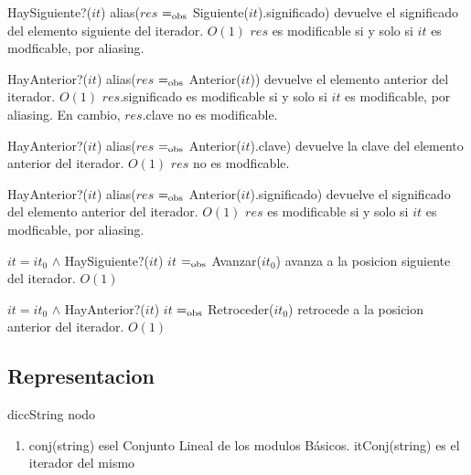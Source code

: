 \newpage
  {HaySiguiente?($it$)}
  {alias($res$ $=_{\mathrm{obs}}$ Siguiente($it$).significado)}
  {devuelve el significado del elemento siguiente del iterador.}
  {$O(1)$}
  {$res$ es modificable si y solo si $it$ es modficable, por aliasing.}

  {HayAnterior?($it$)}
  {alias($res$ $=_{\mathrm{obs}}$ Anterior($it$))}
  {devuelve el elemento anterior del iterador.}
  {$O(1)$}
  {$res$.significado es modificable si y solo si $it$ es modificable, por aliasing. En cambio, $res$.clave no es modificable.}

  {HayAnterior?($it$)}
  {alias($res$ $=_{\mathrm{obs}}$ Anterior($it$).clave)}
  {devuelve la clave del elemento anterior del iterador.}
  {$O(1)$}
  {$res$ no es modficable.}

  {HayAnterior?($it$)}
  {alias($res$ $=_{\mathrm{obs}}$ Anterior($it$).significado)}
  {devuelve el significado del elemento anterior del iterador.}
  {$O(1)$}
  {$res$ es modificable si y solo si $it$ es modficable, por aliasing.}


  {$it = it_0$ $\land$ HaySiguiente?($it$)}
  {$it$ $=_{\mathrm{obs}}$ Avanzar($it_0$)}
  {avanza a la posicion siguiente del iterador.}
  {$O(1)$}
  {}

  {$it = it_0$ $\land$ HayAnterior?($it$)}
  {$it$ $=_{\mathrm{obs}}$ Retroceder($it_0$)}
  {retrocede a la posicion anterior del iterador.}
  {$O(1)$}
  {}


\newpage
\subsection{Representacion}
diccString
nodo

\begin{enumerate}
\item conj(string) esel Conjunto Lineal de los modulos Básicos. itConj(string) es el iterador del mismo

\end{enumerate}

